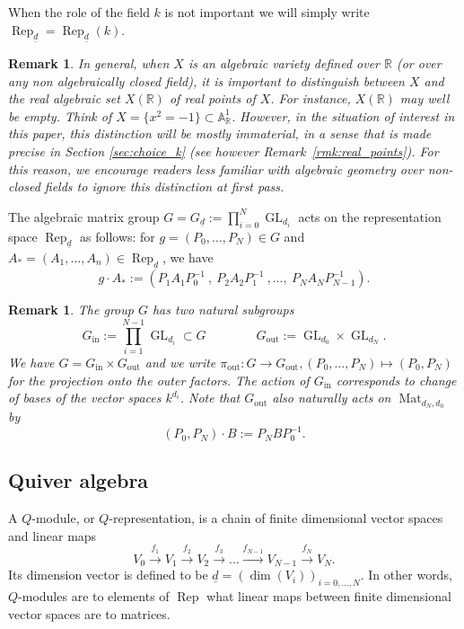 \documentclass[a4paper]{amsart}
\DeclareMathOperator{\Rep}{\mathrm{Rep}}
\DeclareMathOperator{\Mat}{\mathrm{Mat}}
\DeclareMathOperator{\GL}{\mathrm{GL}}
\newcommand{\R}{\mathbb{R}}
\newcommand{\A}{\mathbb{A}}
\newcommand{\ud}{\underline{d}}
\newcommand{\ins}{\mathrm{in}}
\newcommand{\out}{\mathrm{out}}
\theoremstyle{plain}
\newtheorem{remark}[thm]{Remark}
\begin{document}
When the role of the field $k$ is not important we will simply write $\Rep_{\ud}=\Rep_{\ud}(k)$.

\begin{remark} \label{rmk:choice_k}\rm
    In general, when $X$ is an algebraic variety defined over $\R$ (or over any non algebraically closed field), it is important to distinguish between $X$ and the \emph{real algebraic set} $X(\R)$ of real points of $X$. For instance, $X(\R)$ may well be empty. Think of $X=\{x^2=-1\}\subset \A^1_\R$.
    However, in the situation of interest in this paper, this distinction will be mostly immaterial, in a sense that is made precise in Section \ref{sec:choice_k} (see however Remark~\ref{rmk:real_points}). For this reason, we encourage readers less familiar with algebraic geometry over non-closed fields to ignore this distinction at first pass.
\end{remark}

The algebraic matrix group $G=G_{\ud}:=\prod_{i=0}^{N} \GL_{d_i}$ acts on the representation space $\Rep_{\ud}$ as follows: for $g=(P_0,\ldots,P_N)\in G$ and $A_*=(A_1,\ldots,A_n)\in \Rep_{\ud}$, we have
\[
g\cdot A_*:=(P_1 A_1 P_0^{-1}\ ,\ P_2 A_2 P_1^{-1}\ ,\ldots,\ P_N A_N P_{N-1}^{-1}).
\]

\begin{remark} \label{rem:GinGout} \rm
    The group $G$ has two natural subgroups 
\[
G_\ins:= \prod_{i=1}^{N-1} \GL_{d_i}\subset G
\qquad\qquad
G_\out:=\GL_{d_0}\times \GL_{d_N}.\]
We have $G=G_\ins\times G_\out$ and we write $\pi_\out:G\to G_\out, (P_0,\ldots,P_N)\mapsto (P_0,P_N)$ for the projection onto the outer factors. The action of $G_{\ins}$ corresponds to change of bases of the vector spaces $k^{d_i}$. Note that $G_\out$ also naturally acts on $\Mat_{d_N,d_0}$ by
\[
(P_0,P_N)\cdot B:= P_N B P_0^{-1}.
\]
\end{remark}

\subsection{Quiver algebra}\label{sec:quiver_alg}

A $Q$-module, or $Q$-representation, is a chain of finite dimensional vector spaces and linear maps 
\[
V_0 \xrightarrow{f_1} V_1 \xrightarrow{f_2} V_2 \xrightarrow{f_3} \ldots \xrightarrow{f_{N-1}} V_{N-1} \xrightarrow{f_N} V_N. 
\]
Its dimension vector is defined to be $\ud=(\dim(V_i))_{i=0,\ldots,N}$. In other words, $Q$-modules are to elements of $\Rep$ what linear maps between finite dimensional vector spaces are to matrices.
\end{document}
